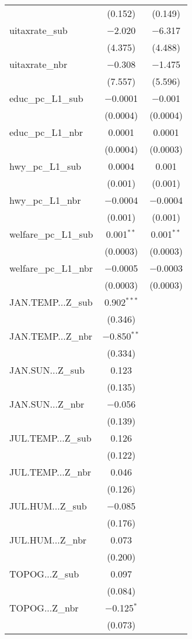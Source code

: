 \begin{table}[!htbp]
\begin{tabular}{@{\extracolsep{5pt}}lcc}
  & (0.152) & (0.149) \\ 
  uitaxrate\_sub & $-$2.020 & $-$6.317 \\ 
  & (4.375) & (4.488) \\ 
  uitaxrate\_nbr & $-$0.308 & $-$1.475 \\ 
  & (7.557) & (5.596) \\ 
  educ\_pc\_L1\_sub & $-$0.0001 & $-$0.001 \\ 
  & (0.0004) & (0.0004) \\ 
  educ\_pc\_L1\_nbr & 0.0001 & 0.0001 \\ 
  & (0.0004) & (0.0003) \\ 
  hwy\_pc\_L1\_sub & 0.0004 & 0.001 \\ 
  & (0.001) & (0.001) \\ 
  hwy\_pc\_L1\_nbr & $-$0.0004 & $-$0.0004 \\ 
  & (0.001) & (0.001) \\ 
  welfare\_pc\_L1\_sub & 0.001$^{**}$ & 0.001$^{**}$ \\ 
  & (0.0003) & (0.0003) \\ 
  welfare\_pc\_L1\_nbr & $-$0.0005 & $-$0.0003 \\ 
  & (0.0003) & (0.0003) \\ 
  JAN.TEMP...Z\_sub & 0.902$^{***}$ &  \\ 
  & (0.346) &  \\ 
  JAN.TEMP...Z\_nbr & $-$0.850$^{**}$ &  \\ 
  & (0.334) &  \\ 
  JAN.SUN...Z\_sub & 0.123 &  \\ 
  & (0.135) &  \\ 
  JAN.SUN...Z\_nbr & $-$0.056 &  \\ 
  & (0.139) &  \\ 
  JUL.TEMP...Z\_sub & 0.126 &  \\ 
  & (0.122) &  \\ 
  JUL.TEMP...Z\_nbr & 0.046 &  \\ 
  & (0.126) &  \\ 
  JUL.HUM...Z\_sub & $-$0.085 &  \\ 
  & (0.176) &  \\ 
  JUL.HUM...Z\_nbr & 0.073 &  \\ 
  & (0.200) &  \\ 
  TOPOG...Z\_sub & 0.097 &  \\ 
  & (0.084) &  \\ 
  TOPOG...Z\_nbr & $-$0.125$^{*}$ &  \\ 
  & (0.073) &  \\ 

\end{tabular}
\end{table}
